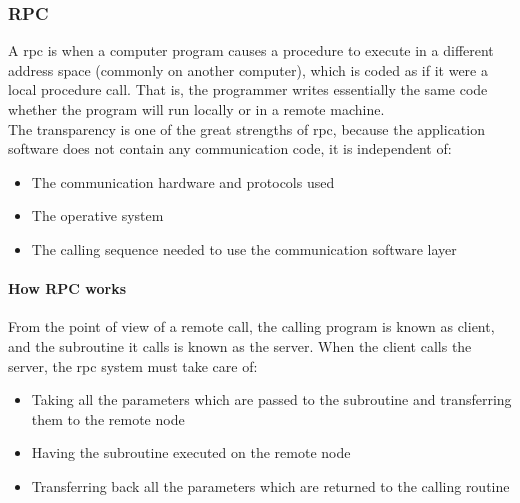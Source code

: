 \documentclass[a4paper, 12pt]{article} %
\begin{document}
        \subsubsection{RPC}
            A \acrfull{rpc}\cite{rpc} is when a computer program causes a procedure to execute in a different address space (commonly on another computer), which is coded as if it were a local procedure call. That is, the programmer writes essentially the same code whether the program will run locally or in a remote machine.\\
            
            The transparency is one of the great strengths of \acrshort{rpc}, because the application software does not contain any communication code, it is independent of:
            \begin{itemize}
                \item The communication hardware and protocols used
                \item The operative system
                \item The calling sequence needed to use the communication software layer
            \end{itemize}
            
            \paragraph{How RPC works}
                From the point of view of a remote call, the calling program is known as client, and the subroutine it calls is known as the server\cite{rpcInOS}\cite{howRPC}. When the client calls the server, the \acrshort{rpc} system must take care of:
                \begin{itemize}
                    \item Taking all the parameters which are passed to the subroutine and transferring them to the remote node
                    \item Having the subroutine executed on the remote node
                    \item Transferring back all the parameters which are returned to the calling routine
                \end{itemize}
                
\end{document}
